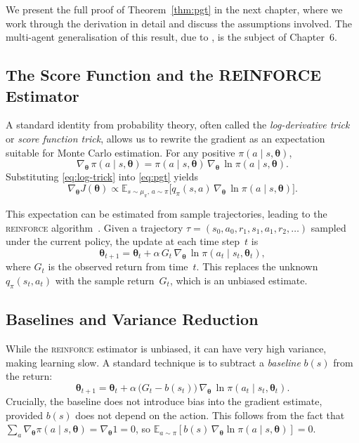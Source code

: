 \documentclass[a4paper,oneside,11pt]{report}
\begin{document}
We present the full proof of Theorem~\ref{thm:pgt} in the next chapter, where we work through the derivation in detail and discuss the assumptions involved. The multi-agent generalisation of this result, due to \cite{kim2021policygradientalgorithmlearning}, is the subject of Chapter~6.

\subsection{The Score Function and the REINFORCE Estimator}
\label{subsec:reinforce}

A standard identity from probability theory, often called the \emph{log-derivative trick} or \emph{score function trick}, allows us to rewrite the gradient as an expectation suitable for Monte Carlo estimation. For any positive $\pi(a\mid s,\bm{\theta})$,
\begin{equation}\label{eq:log-trick}
  \nabla_{\bm{\theta}}\,\pi(a\mid s,\bm{\theta}) = \pi(a\mid s,\bm{\theta})\, \nabla_{\bm{\theta}}\,\ln\pi(a\mid s,\bm{\theta}).
\end{equation}
Substituting \eqref{eq:log-trick} into \eqref{eq:pgt} yields
\begin{equation}\label{eq:pgt-expectation}
  \nabla_{\bm{\theta}} J(\bm{\theta}) \propto \mathbb{E}_{s\sim\mu_\pi,\, a\sim\pi} \bigl[ q_\pi(s,a)\, \nabla_{\bm{\theta}}\,\ln\pi(a\mid s,\bm{\theta}) \bigr].
\end{equation}

This expectation can be estimated from sample trajectories, leading to the \textsc{reinforce} algorithm~\cite{sutton2018rl}. Given a trajectory $\tau = (s_0, a_0, r_1, s_1, a_1, r_2, \ldots)$ sampled under the current policy, the update at each time step~$t$ is
\begin{equation}\label{eq:reinforce-update}
  \bm{\theta}_{t+1} = \bm{\theta}_t + \alpha\, G_t\, \nabla_{\bm{\theta}}\, \ln\pi(a_t\mid s_t,\bm{\theta}_t),
\end{equation}
where $G_t$ is the observed return from time~$t$. This replaces the unknown $q_\pi(s_t,a_t)$ with the sample return~$G_t$, which is an unbiased estimate.

\subsection{Baselines and Variance Reduction}
\label{subsec:baselines}

While the \textsc{reinforce} estimator is unbiased, it can have very high variance, making learning slow. A standard technique is to subtract a \emph{baseline} $b(s)$ from the return:
\begin{equation}\label{eq:baseline}
  \bm{\theta}_{t+1} = \bm{\theta}_t + \alpha\, \bigl(G_t - b(s_t)\bigr)\, \nabla_{\bm{\theta}}\,\ln\pi(a_t\mid s_t,\bm{\theta}_t).
\end{equation}
Crucially, the baseline does not introduce bias into the gradient estimate, provided $b(s)$ does not depend on the action. This follows from the fact that $\sum_a \nabla_{\bm{\theta}}\pi(a\mid s,\bm{\theta}) = \nabla_{\bm{\theta}} 1 = 0$, so $\mathbb{E}_{a\sim\pi}[b(s)\,\nabla_{\bm{\theta}}\ln\pi(a\mid s,\bm{\theta})] = 0$.
\end{document}
